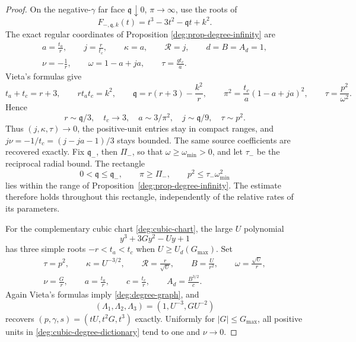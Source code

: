 \begin{proof}
On the negative-\(\gamma\) far face \(\mathfrak q\downarrow0\),
\(\pi\to\infty\), use the roots of
\[
 F_{-,\mathfrak q,k}(t)=t^3-3t^2-\mathfrak q t+k^2.
\]
The exact regular coordinates of Proposition
\ref{deg:prop-degree-infinity} are
\begin{equation}
 \begin{gathered}
 a=\frac{t_a}{r},\qquad j=\frac{r}{t_c},\qquad
 \kappa=a,\qquad \mathcal R=j,\qquad d=B=A_d=1,\\
 \nu=-\frac1r,\qquad \omega=1-a+ja,\qquad
 \tau=\frac{gt_c}{a}.
 \end{gathered}
 \label{deg:negative-far-dictionary}
\end{equation}
Vieta's formulas give
\[
 t_a+t_c=r+3,\qquad rt_at_c=k^2,\qquad
 \mathfrak q=r(r+3)-\frac{k^2}{r},\qquad
 \pi^2=\frac{t_c}{a}(1-a+ja)^2,\qquad
 \tau=\frac{p^2}{\omega^2}.
\]
Hence
\[
 r\sim \mathfrak q/3,\quad t_c\to3,\quad a\sim3/\pi^2,\quad
 j\sim \mathfrak q/9,\quad \tau\sim p^2.
\]
Thus \((j,\kappa,\tau)\to0\), the positive-unit entries stay in
compact ranges, and \(j\nu=-1/t_c=(j-ja-1)/3\) stays bounded.
The same source coefficients are recovered exactly. Fix
\(\mathfrak q_-\), then \(\Pi_-\), so that
\(\omega\ge\omega_{\min}>0\), and let \(\tau_-\) be the
reciprocal radial bound. The rectangle
\begin{equation}
 0<\mathfrak q\le \mathfrak q_-,\qquad \pi\ge\Pi_-,\qquad
 p^2\le\tau_-\omega_{\min}^2
 \label{deg:negative-far-rectangle}
\end{equation}
lies within the range of Proposition~\ref{deg:prop-degree-infinity}.
The estimate therefore holds throughout this rectangle, independently
of the relative rates of its parameters.

For the complementary cubic chart \eqref{deg:cubic-chart}, the large
\(U\) polynomial
\[
 y^3+3Gy^2-Uy+1
\]
has three simple roots \(-r<t_a<t_c\) when
\(U\ge U_d(G_{\max})\).  Set
\begin{equation}
 \begin{gathered}
 \tau=p^2,\qquad \kappa=U^{-3/2},\qquad
 \mathcal R=\frac{r}{\sqrt U},\qquad
 B=\frac{U}{r^2},\qquad \omega=\frac{\sqrt U}{r},\\
 \nu=\frac{G}{r},\qquad a=\frac{t_a}{r},\qquad
 c=\frac{t_c}{r},\qquad A_d=\frac{B^{3/2}}{c}.
 \end{gathered}
 \label{deg:cubic-degree-dictionary}
\end{equation}
Again Vieta's formulas imply \eqref{deg:degree-graph}, and
\[
 (\Lambda_1,\Lambda_2,\Lambda_3)=(1,U^{-3},GU^{-2})
\]
recovers \((p,\gamma,s)=(tU,t^2G,t^3)\) exactly.  Uniformly for
\(|G|\le G_{\max}\), all positive units in
\eqref{deg:cubic-degree-dictionary} tend to one and \(\nu\to0\).


\end{proof}
